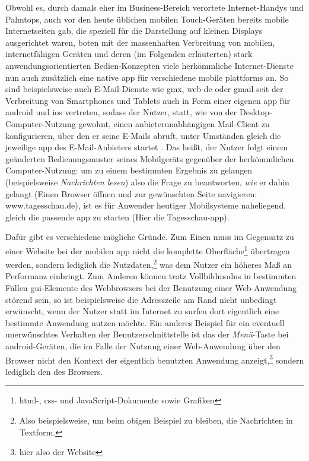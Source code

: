 Obwohl es, durch damals eher im Business-Bereich verortete Internet-Handys und Palmtops, auch vor den heute üblichen mobilen Touch-Geräten bereits mobile Internetseiten gab, die speziell für die Darstellung auf kleinen Displays ausgerichtet waren, boten mit der massenhaften Verbreitung von mobilen, internetfähigen Geräten und deren (im Folgenden erläuterten) stark anwendungsorientierten Bedien-Konzepten viele herkömmliche Internet-Dienste nun auch zusätzlich eine native \gls{app} für verschiedene mobile \glspl{plattform} an.
So sind beispielsweise auch E-Mail-Dienste wie \gls{gmx}, \gls{web-de} oder \gls{gmail} seit der Verbreitung von Smartphones und Tablets auch in Form einer eigenen \gls{app} für \gls{android} und \gls{ios} vertreten, sodass der Nutzer, statt, wie von der Desktop-Computer-Nutzung gewohnt, einen anbieterunabhängigen Mail-Client zu konfigurieren, über den er seine E-Mails abruft, unter Umständen gleich die jeweilige \gls{app} des E-Mail-Anbieters startet \cite{gmx, web.de, gmail}.
Das heißt, der Nutzer folgt einem geänderten Bedienungsmuster seines Mobilgeräts gegenüber der herkömmlichen Computer-Nutzung: um zu einem bestimmten Ergebnis zu gelangen (beispielsweise \emph{Nachrichten lesen}) also die Frage zu beantworten, \emph{wie} er dahin gelangt (Einen Browser öffnen und zur gewünschten Seite navigieren: www.tagesschau.de), ist es für Anwender heutiger Mobilsysteme naheliegend, gleich die passende \gls{app} zu starten (Hier \zB die Tagesschau-\gls{app}).

Dafür gibt es verschiedene mögliche Gründe. Zum Einen muss im Gegensatz zu einer Website bei der mobilen \gls{app} nicht die komplette Oberfläche\footnote{\gls{html}-, \gls{css}- und JavaScript-Dokumente sowie Grafiken} übertragen werden, sondern lediglich die Nutzdaten,\footnote{Also beispielsweise, um beim obigen Beispiel zu bleiben, die Nachrichten in Textform.} was dem Nutzer ein höheres Maß an Performanz einbringt.
Zum Anderen können trotz Vollbildmodus in bestimmten Fällen \gls{gui}-Elemente des Webbrowsers bei der Benutzung einer Web-Anwendung störend sein, so ist beispielsweise die Adresszeile am Rand nicht unbedingt erwünscht, wenn der Nutzer statt im Internet zu surfen dort eigentlich eine bestimmte Anwendung nutzen möchte. 
Ein anderes Beispiel für ein eventuell unerwünschtes Verhalten der Benutzerschnittstelle ist das der \emph{Menü}-Taste bei \gls{android}-Geräten, die im Falle der Nutzung einer Web-Anwendung über den Browser nicht den Kontext der eigentlich benutzten Anwendung anzeigt,\footnote{hier also der Website} sondern lediglich den des Browsers.

